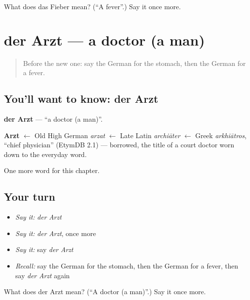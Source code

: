 \begin{tcolorbox}[breakable,colback=teal!4,colframe=teal!35!black,title={Before you move on}]
What does das Fieber mean? (\textquotedblleft{}A fever\textquotedblright{}.) Say it once more.
\end{tcolorbox}
\section[der Arzt]{der Arzt — a doctor (a man)}

\label{lesson:GE-C59-arzt}



\begin{quote}
Before the new one: say the German for the stomach, then the German for a fever.
\end{quote}

\subsection*{You'll want to know: der Arzt}
\textbf{der Arzt} — \textquotedblleft{}a doctor (a man)\textquotedblright{}.

\begin{cousinweb}
\textbf{Arzt} $\leftarrow$ Old High German \emph{arzat} $\leftarrow$ Late Latin \emph{archiāter} $\leftarrow$ Greek \emph{arkhiātros}, \textquotedblleft{}chief physician\textquotedblright{} (EtymDB 2.1) — borrowed, the title of a court doctor worn down to the everyday word.
\end{cousinweb}

\begin{grammarlens}[title={What you've built}]
One more word for this chapter.
\end{grammarlens}

\subsection*{Your turn}
\begin{itemize}
\raggedright
  \item \emph{Say it:} \emph{der Arzt}
  \item \emph{Say it:} \emph{der Arzt}, once more
  \item \emph{Say it:} say \emph{der Arzt}
  \item \emph{Recall:} say the German for the stomach, then the German for a fever, then say \emph{der Arzt} again
\end{itemize}

\begin{tcolorbox}[breakable,colback=teal!4,colframe=teal!35!black,title={Before you move on}]
What does der Arzt mean? (\textquotedblleft{}A doctor (a man)\textquotedblright{}.) Say it once more.
\end{tcolorbox}
